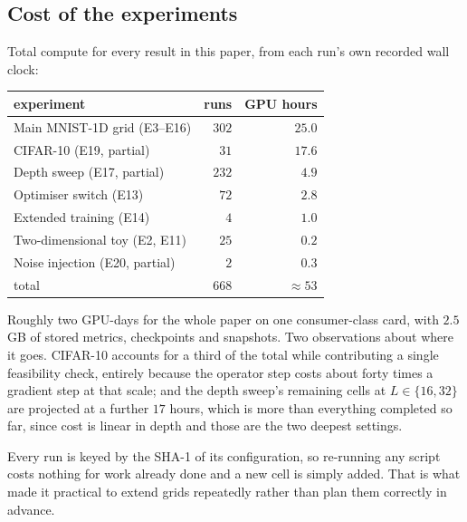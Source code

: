 \documentclass{article} %
\theoremstyle{plain}
\theoremstyle{definition}
\theoremstyle{remark}
\begin{document}
\subsection{Cost of the experiments}

Total compute for every result in this paper, from each run's own recorded wall clock:

\begin{center}\small
\begin{tabular}{lrr}
\toprule
experiment & runs & GPU hours \\
\midrule
Main MNIST-1D grid (E3--E16) & $302$ & $25.0$ \\
CIFAR-10 (E19, partial) & $31$ & $17.6$ \\
Depth sweep (E17, partial) & $232$ & $4.9$ \\
Optimiser switch (E13) & $72$ & $2.8$ \\
Extended training (E14) & $4$ & $1.0$ \\
Two-dimensional toy (E2, E11) & $25$ & $0.2$ \\
Noise injection (E20, partial) & $2$ & $0.3$ \\
\midrule
total & $668$ & $\approx 53$ \\
\bottomrule
\end{tabular}
\end{center}

Roughly two GPU-days for the whole paper on one consumer-class card, with $2.5$\,GB of stored
metrics, checkpoints and snapshots. Two observations about where it goes. CIFAR-10 accounts for a
third of the total while contributing a single feasibility check, entirely because the operator
step costs about forty times a gradient step at that scale; and the depth sweep's remaining cells
at $L \in \{16, 32\}$ are projected at a further $17$ hours, which is more than everything
completed so far, since cost is linear in depth and those are the two deepest settings.

Every run is keyed by the SHA-1 of its configuration, so re-running any script costs nothing for
work already done and a new cell is simply added. That is what made it practical to extend grids
repeatedly rather than plan them correctly in advance.
\end{document}
